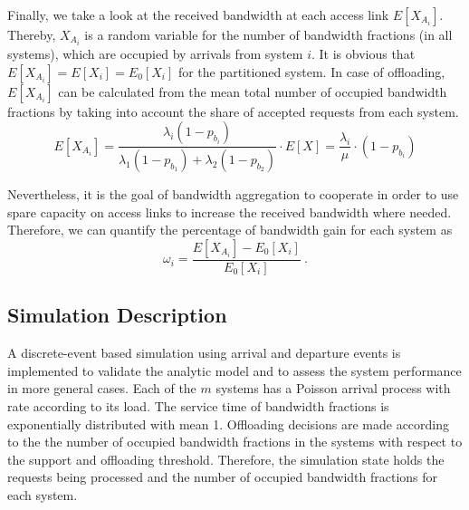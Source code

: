 Finally, we take a look at the received bandwidth at each access link $E[X_{A_i}]$. Thereby, $X_{A_i}$ is a random variable for the number of bandwidth fractions (in all systems), which are occupied by arrivals from system $i$. It is obvious that $E[X_{A_i}] = E[X_i]
 = E_0[X_i]$ for the partitioned system. In case of offloading, $E[X_{A_i}]$ can be calculated from the mean total number of occupied bandwidth fractions by taking into account the share of accepted requests from each system.
\begin{equation}\label{equ:gain}
E[X_{A_i}] = \frac{\lambda_i(1-p_{b_i})}{\lambda_1(1-p_{b_1})+\lambda_2(1-p_{b_2})}\cdot E[X] = \frac{\lambda_i}{\mu}\cdot (1-p_{b_i})
\end{equation}

Nevertheless, it is the goal of bandwidth aggregation to cooperate in order to use spare capacity on access links to increase the received bandwidth where needed. Therefore, we can quantify the percentage of bandwidth gain for each system as
\begin{equation}
\omega_i = \frac{E[X_{A_i}]-E_0[X_i]}{E_0[X_i]}\ .
\end{equation}

\subsection{Simulation Description}
A discrete-event based simulation using arrival and departure events is implemented to validate the analytic model and to assess the system performance in more general cases. Each of the $m$ systems has a Poisson arrival process with rate according to its load. The service time of bandwidth fractions is exponentially distributed with mean 1. Offloading decisions are made according to the the number of occupied bandwidth fractions in the systems with respect to the support and offloading threshold. Therefore, the simulation state holds the requests being processed and the number of occupied bandwidth fractions for each system.
